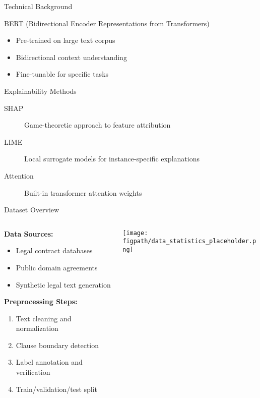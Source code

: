 \begin{frame}{Technical Background}
\begin{block}{BERT (Bidirectional Encoder Representations from Transformers)}
\begin{itemize}
    \item Pre-trained on large text corpus
    \item Bidirectional context understanding
    \item Fine-tunable for specific tasks
\end{itemize}
\end{block}

\begin{block}{Explainability Methods}
\begin{description}
    \item[SHAP] Game-theoretic approach to feature attribution
    \item[LIME] Local surrogate models for instance-specific explanations
    \item[Attention] Built-in transformer attention weights
\end{description}
\end{block}
\end{frame}

\begin{frame}{Dataset Overview}
\begin{columns}
\begin{column}{0.6\textwidth}
\textbf{Data Sources:}
\begin{itemize}
    \item Legal contract databases
    \item Public domain agreements
    \item Synthetic legal text generation
\end{itemize}

\vspace{0.5cm}
\textbf{Preprocessing Steps:}
\begin{enumerate}
    \item Text cleaning and normalization
    \item Clause boundary detection
    \item Label annotation and verification
    \item Train/validation/test split
\end{enumerate}
\end{column}
\begin{column}{0.4\textwidth}
\begin{center}
\texttt{[image: \\figpath/data\_statistics\_placeholder.png]}
\end{center}
\end{column}
\end{columns}
\end{frame}
